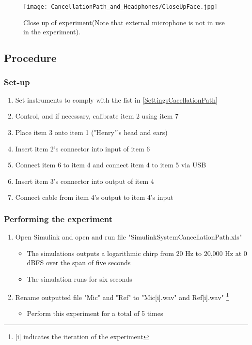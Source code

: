 \begin{figure}[H]
	\centering
	\texttt{[image: CancellationPath\_and\_Headphones/CloseUpFace.jpg]}
	\caption{Close up of experiment(Note that external microphone is not in use in the experiment).}
	\label{CloseUpCancellationPath}
\end{figure}

\subsection{Procedure}
\subsubsection{Set-up}
\begin{enumerate}
	\item Set instruments to comply with the list in \ref{SettingsCacellationPath}
	\item Control, and if necessary, calibrate item 2 using item 7
	\item Place item 3 onto item 1 ("Henry"'s head and ears)
	\item Insert item 2's connector into input of item 6
	\item Connect item 6 to item 4 and connect item 4 to item 5 via USB
	\item Insert item 3's connector into output of item 4
	\item Connect cable from item 4's output to item 4's input
\end{enumerate}

\subsubsection{Performing the experiment}
\begin{enumerate}
	\item Open Simulink\textsuperscript{\textregistered} and open and run file "SimulinkSystemCancellationPath.xls"
	\begin{itemize} 
		\item The simulations outputs a logarithmic chirp from 20 Hz to 20,000 Hz at 0 dBFS over the span of five seconds
		\item The simulation runs for six seconds
	\end{itemize}
	\item Rename outputted file "Mic" and "Ref" to "Mic[i].wav" and Ref[i].wav" \footnote{[i] indicates the iteration of the experiment}
	\begin{itemize}
		\item[] Perform this experiment for a total of 5 times
	\end{itemize}
\end{enumerate}


